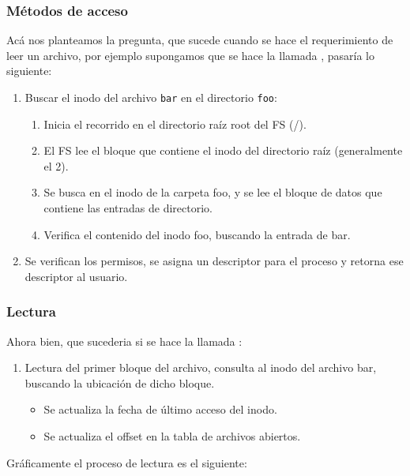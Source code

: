 \documentclass[openany]{book}
\begin{document}
\subsubsection{Métodos de acceso}

Acá nos planteamos la pregunta, que sucede cuando se hace el requerimiento de leer un archivo, por ejemplo supongamos que se hace la llamada , pasaría lo siguiente:

\begin{enumerate}
    \item Buscar el inodo del archivo \texttt{bar} en el directorio \texttt{foo}:
    \begin{enumerate}
        \item Inicia el recorrido en el directorio raíz \colorbox{green!20}{root} del FS (/).
        \item El FS lee el bloque que contiene el inodo del directorio raíz (generalmente el 2).
        \item Se busca en el inodo de la carpeta foo, y se lee el bloque de datos que contiene las entradas de directorio.
        \item Verifica el contenido del inodo foo, buscando la entrada de bar.
    \end{enumerate}
    \item Se verifican los permisos, se asigna un descriptor para el proceso y retorna ese descriptor al usuario.
\end{enumerate}

\subsubsection{Lectura}

Ahora bien, que sucederia si se hace la llamada : 

\begin{enumerate}
    \item Lectura del primer bloque del archivo, consulta al inodo del archivo bar, buscando la ubicación de dicho bloque.
    \begin{itemize}
        \item Se actualiza la fecha de último acceso del inodo.
        \item Se actualiza el offset en la tabla de archivos abiertos.
    \end{itemize}
\end{enumerate}

Gráficamente el proceso de lectura es el siguiente:
\end{document}
